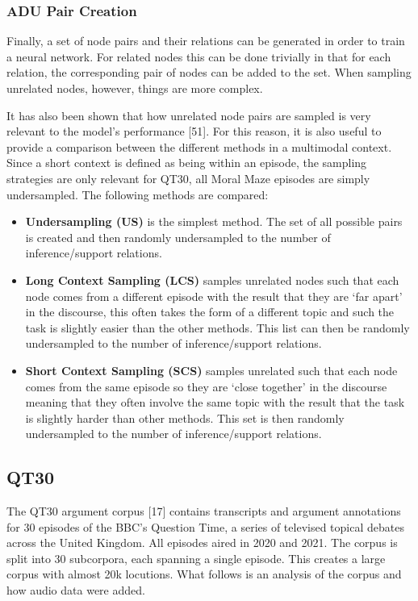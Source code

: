\documentclass[twocolumn]{article}
\providecommand{\tightlist}{%
  \setlength{\itemsep}{0pt}\setlength{\parskip}{0pt}}
\begin{document}
\subsubsection{ADU Pair Creation}\label{sec:pair-creation}

Finally, a set of node pairs and their relations can be generated in
order to train a neural network. For related nodes this can be done
trivially in that for each relation, the corresponding pair of nodes can
be added to the set. When sampling unrelated nodes, however, things are
more complex.

It has also been shown that how unrelated node pairs are sampled is very
relevant to the model's performance {[}51{]}. For this reason, it is
also useful to provide a comparison between the different methods in a
multimodal context. Since a short context is defined as being within an
episode, the sampling strategies are only relevant for QT30, all Moral
Maze episodes are simply undersampled. The following methods are
compared:

\begin{itemize}
\tightlist
\item
  \textbf{Undersampling (US)} is the simplest method. The set of all
  possible pairs is created and then randomly undersampled to the number
  of inference/support relations.
\item
  \textbf{Long Context Sampling (LCS)} samples unrelated nodes such that
  each node comes from a different episode with the result that they are
  `far apart' in the discourse, this often takes the form of a different
  topic and such the task is slightly easier than the other methods.
  This list can then be randomly undersampled to the number of
  inference/support relations.
\item
  \textbf{Short Context Sampling (SCS)} samples unrelated such that each
  node comes from the same episode so they are `close together' in the
  discourse meaning that they often involve the same topic with the
  result that the task is slightly harder than other methods. This set
  is then randomly undersampled to the number of inference/support
  relations.
\end{itemize}

\subsection{QT30}\label{qt30}

The QT30 argument corpus {[}17{]} contains transcripts and argument
annotations for 30 episodes of the BBC's Question Time, a series of
televised topical debates across the United Kingdom. All episodes aired
in 2020 and 2021. The corpus is split into 30 subcorpora, each spanning
a single episode. This creates a large corpus with almost 20k locutions.
What follows is an analysis of the corpus and how audio data were added.
\end{document}
